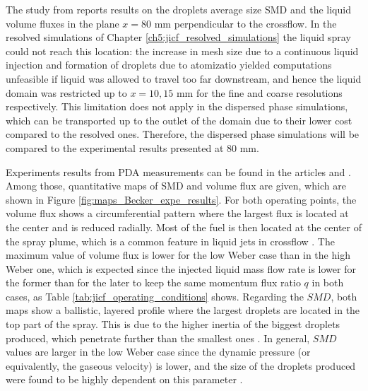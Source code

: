 The study from  reports results on the droplets average size SMD and the liquid volume fluxes in the plane $x = 80$  mm perpendicular to the crossflow. In the resolved simulations of Chapter \ref{ch5:jicf_resolved_simulations} the liquid spray could not reach this location: the increase in mesh size due to a continuous liquid injection and formation of droplets due to atomizatio yielded computations unfeasible if liquid was allowed to travel too far downstream, and hence the liquid domain was restricted up to $x = 10, 15$ mm for the fine and coarse resolutions respectively. This limitation does not apply in the dispersed phase simulations, which can be transported up to the outlet of the domain due to their lower cost compared to the resolved ones. Therefore, the dispersed phase simulations will be compared to the experimental results presented at 80 mm.

Experiments results from PDA measurements can be found in the articles  and . Among those, quantitative maps of SMD and volume flux are given, which are shown in Figure \ref{fig:maps_Becker_expe_results}. For both operating points, the volume flux shows a circumferential pattern where the largest flux is located at the center and is reduced radially. Most of the fuel is then located at the center of the spray plume, which is a common feature in liquid jets in crossflow \citepColor[wu_spray_1998]. The maximum value of volume flux is lower for the low Weber case than in the high Weber one, which is expected since the injected liquid mass flow rate is lower for the former than for the later to keep the same momentum flux ratio $q$ in both cases, as Table \ref{tab:jicf_operating_conditions} shows. Regarding the $SMD$, both maps show a ballistic, layered profile where the largest droplets are located in the top part of the spray. This is due to the higher inertia of the biggest droplets produced, which penetrate further than the smallest ones \citepColor[wu_breakup_1997]. In general, $SMD$ values are larger in the low Weber case since the dynamic pressure (or equivalently, the gaseous velocity) is lower, and the size of the droplets produced were found to be highly dependent on this parameter .


